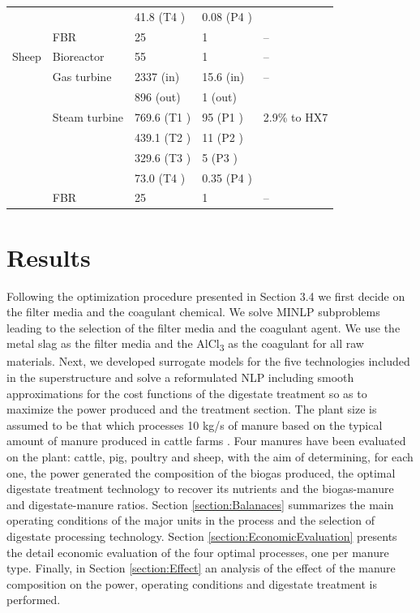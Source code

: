 \begin{refsection}[referencesCh2]
\begin{table}[h!]
{\begin{tabular}{@{}lllll@{}}
		&               & 41.8 (T4 )  & 0.08 (P4 ) &              \\
		& FBR           & 25          & 1          & –            \\
		Sheep   & Bioreactor    & 55          & 1          & –            \\
		& Gas turbine   & 2337 (in)   & 15.6 (in)  & –            \\
		&               & 896 (out)   & 1 (out)    &              \\
		& Steam turbine & 769.6 (T1 ) & 95 (P1 )   & 2.9\% to HX7 \\
		&               & 439.1 (T2 ) & 11 (P2 )   &              \\
		&               & 329.6 (T3 ) & 5 (P3 )    &              \\
		&               & 73.0 (T4 )  & 0.35 (P4 ) &              \\
		& FBR           & 25          & 1          & –            \\ \bottomrule
	\end{tabular}
	}
\end{table}

\section{Results} \label{section:Results}
Following the optimization procedure presented in Section 3.4 we first decide on the filter media and the coagulant chemical. We solve MINLP subproblems leading to the selection of the filter media and the coagulant agent. We use the metal slag as the filter media and the AlCl\textsubscript{3} as the coagulant for all raw materials. Next, we developed surrogate models for the five technologies included in the superstructure and solve a reformulated NLP including smooth approximations for the cost functions of the digestate treatment so as to maximize the power produced and the treatment section. The plant size is assumed to be that which processes 10 kg/s of manure based on the typical amount of manure produced in cattle farms \citep{LeonMsc}. Four manures have been evaluated on the plant: cattle, pig, poultry and sheep, with the aim of determining, for each one, the power generated the composition of the biogas produced, the optimal digestate treatment technology to recover its nutrients and the biogas-manure and digestate-manure ratios. Section \ref{section:Balanaces} summarizes the main operating conditions of the major units in the process and the selection of digestate processing technology. Section \ref{section:EconomicEvaluation} presents the detail economic evaluation of the four optimal processes, one per manure type. Finally, in Section \ref{section:Effect} an analysis of the effect of the manure composition on the power, operating conditions and digestate treatment is performed.



\end{refsection}
